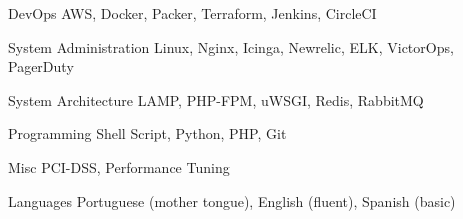 

\begin{cvskills}

  \cvskill
    {DevOps} %
    {AWS, Docker, Packer, Terraform, Jenkins, CircleCI} %

  \cvskill
    {System Administration} %
    {Linux, Nginx, Icinga, Newrelic, ELK, VictorOps, PagerDuty} %

  \cvskill
    {System Architecture} %
    {LAMP, PHP-FPM, uWSGI, Redis, RabbitMQ} %

  \cvskill
    {Programming} %
    {Shell Script, Python, PHP, Git} %

  \cvskill
    {Misc} %
    {PCI-DSS, Performance Tuning} %

  \cvskill
    {Languages} %
    {Portuguese (mother tongue), English (fluent), Spanish (basic)} %

\end{cvskills}
